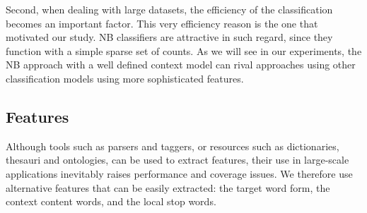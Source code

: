 \documentclass[english]{jnlp_1.4}
\begin{document}
Second, when dealing with large datasets, the effi{}ciency of the
classifi{}cation becomes an important factor. This very efficiency
reason is the one that motivated our study. NB classifiers are attractive
in such regard, since they function with a simple sparse set of counts.
As we will see in our experiments, the NB approach with a well defined
context model can rival approaches using other classification models
using more sophisticated features.


\subsection{Features}

Although tools such as parsers and taggers, or resources such as dictionaries,
thesauri and ontologies, can be used to extract features, their use
in large-scale applications inevitably raises performance and coverage
issues. We therefore use alternative features that can be easily extracted:
the target word form, the context content words, and the local stop
words.
\end{document}
